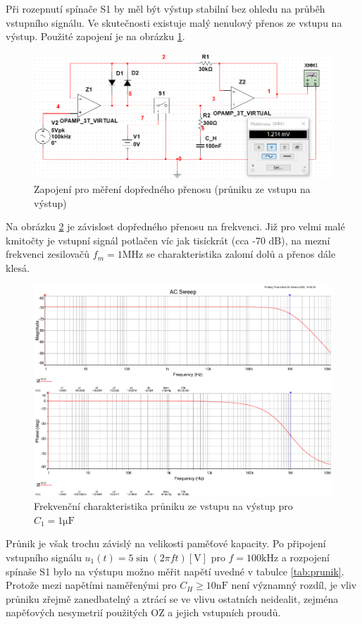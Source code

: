 \documentclass[twoside]{article}
\begin{document}
Při rozepnutí spínače S1 by měl být výstup stabilní bez ohledu na průběh vstupního signálu.
Ve skutečnosti existuje malý nenulový přenos ze vstupu na výstup. Použité zapojení je na obrázku \ref{fig:prunik_schema}.


\begin{figure}[h!]
    \centering
    \includegraphics[width=0.7\linewidth]{prunik_schema.png}
    \caption{Zapojení pro měření dopředného přenosu (průniku ze vstupu na výstup)}
    \label{fig:prunik_schema}
\end{figure}

Na obrázku \ref{fig:bode_prunik_1000} je závislost dopředného přenosu na frekvenci.
Již pro velmi malé kmitočty je vstupní signál potlačen víc jak tisíckrát (cca -70 dB),
na mezní frekvenci zesilovačů $f_m = 1\si{\mega\hertz}$ se charakteristika zalomí dolů 
a přenos dále klesá.


\begin{figure}[h!]
    \centering
    \includegraphics[width=0.92\linewidth]{bode_prunik_1000.pdf}
    \caption{Frekvenční charakteristika průniku ze vstupu na výstup pro $C_1 = 1 \si{\micro\farad}$}
    \label{fig:bode_prunik_1000}
\end{figure}

Průnik je však trochu závislý na velikosti paměťové kapacity.
Po připojení vstupního signálu $u_1(t) = 5 \sin (2\pi f t) [\si{\volt}]$ pro $f = 100 \si{\kilo\hertz}$
a rozpojení spínaše S1 bylo na výstupu možno měřit napětí uvedné v tabulce \ref{tab:prunik}.
Protože mezi napětími naměřenými pro $C_H \ge 10 \si{\nano\farad}$ není významný rozdíl,
je vliv průniku zřejmě zanedbatelný a ztrácí se ve vlivu ostatních neidealit, zejména napěťových
nesymetrií použitých OZ a jejich vstupních proudů.
\end{document}
